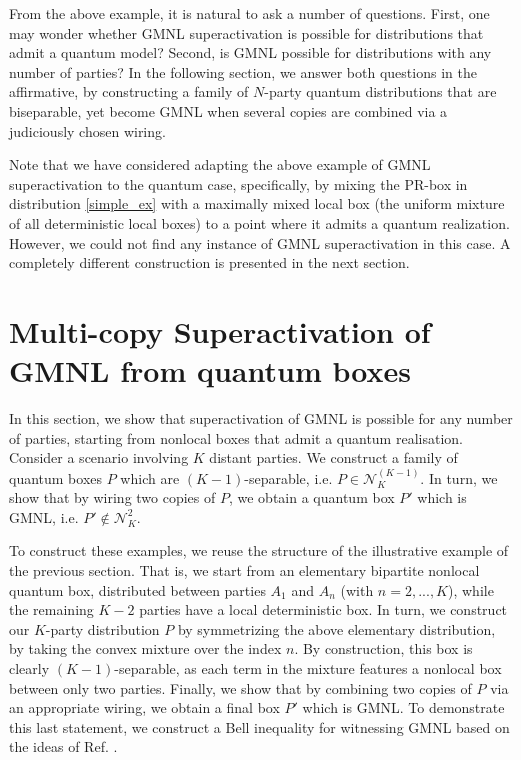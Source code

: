 \documentclass[pra,aps,reprint,superscriptaddress]{revtex4-2}
\theoremstyle{theorem}
\begin{document}
From the above example, it is natural to ask a number of questions. First, one may wonder whether GMNL superactivation is possible for distributions that admit a quantum model? Second, is GMNL possible for distributions with any number of parties? In the following section, we answer both questions in the affirmative, by constructing a family of $N$-party quantum distributions that are biseparable, yet become GMNL when several copies are combined via a judiciously chosen wiring. 


Note that we have considered adapting the above example of GMNL superactivation to the quantum case, specifically, by mixing the PR-box in distribution \eqref{simple_ex} with a maximally mixed local box (the uniform mixture of all deterministic local boxes) to a point where it admits a quantum realization. However, we could not find any instance of GMNL superactivation in this case. A completely different construction is presented in the next section.


\section{Multi-copy Superactivation of GMNL from quantum boxes}


In this section, we show that superactivation of GMNL is possible for any number of parties, starting from nonlocal boxes that admit a quantum realisation. Consider a scenario involving $K$ distant parties. We construct a family of quantum boxes $P$ which are $(K-1)$-separable, i.e. $P \in \mathcal{N}^{(K-1)}_K$. In turn, we show that by wiring two copies of $P$, we obtain a quantum box $P'$ which is GMNL, i.e. $P' \notin \mathcal{N}^2_K$.

To construct these examples, we reuse the structure of the illustrative example of the previous section. That is, we start from an elementary bipartite nonlocal quantum box, distributed between parties $A_1$ and $A_n$ (with $n=2,...,K$), while the remaining $K-2$ parties have a local deterministic box. In turn, we construct our $K$-party distribution $P$ by symmetrizing the above elementary distribution, by taking the convex mixture over the index $n$. By construction, this box is clearly $(K-1)$-separable, as each term in the mixture features a nonlocal box between only two parties. Finally, we show that by combining two copies of $P$ via an appropriate wiring, we obtain a final box $P'$ which is GMNL. To demonstrate this last statement, we construct a Bell inequality for witnessing GMNL based on the ideas of Ref. \cite{Contreras_Tejada_2021}.
\end{document}
